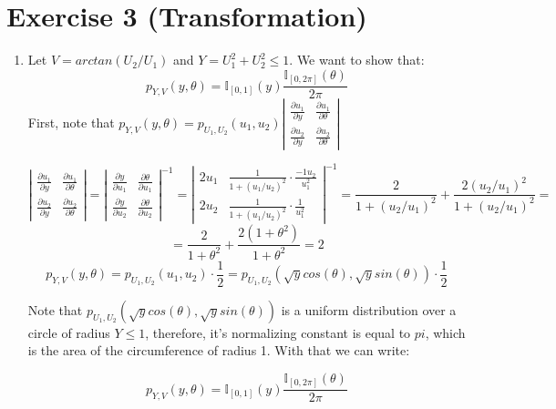 \documentclass[12pt,letterpaper]{article}
\begin{document}
\section*{Exercise 3 (Transformation)}
\begin{enumerate}[leftmargin=!,labelindent=5pt]

	\item Let $V = arctan(U_2/U_1)$ and $Y = U_1^2 + U_2^2 \leq 1$.
	We want to show that:
	$$p_{Y,V}(y,\theta) =
	\mathbb{I}_{[0,1]}(y)\frac{\mathbb{I}_{[0,2\pi]}(\theta)}{2\pi}$$
	First, note that $p_{Y,V}(y,\theta) = p_{U_1,U_2}(u_1,u_2)
	\left|\begin{array}{ccc}
	\frac{\partial u_1}{\partial y} & \frac{\partial u_1}{\partial \theta}
	\\
	\frac{\partial u_2}{\partial y} & \frac{\partial u_2}{\partial \theta}
	\end{array}\right|$

	$$
	\left|\begin{array}{ccc}
	\frac{\partial u_1}{\partial y} & \frac{\partial u_1}{\partial \theta}
	\\
	\frac{\partial u_2}{\partial y} & \frac{\partial u_2}{\partial \theta}
	\end{array}\right| =
	\left|\begin{array}{ccc}
	\frac{\partial y}{\partial u_1} & \frac{\partial \theta}{\partial u_1}
	\\
	\frac{\partial y}{\partial u_2} & \frac{\partial \theta}{\partial u_2}
	\end{array}\right|^{-1} = 
	\left|\begin{array}{ccc}
	2u_1 & \frac{1}{1+(u_1/u_2)^2}\cdot \frac{-1u_2}{u_1^2}
	\\
	2u_2 & \frac{1}{1+(u_1/u_2)^2}\cdot \frac{1}{u_1^2}
	\end{array}\right|^{-1} = 
	\frac{2}{1+(u_2/u_1)^2} + \frac{2(u_2/u_1)^2}{1+(u_2/u_1)^2}=
	$$
	$$ = \frac{2}{1+\theta^2} + \frac{2(1+\theta^2)}{1+\theta^2} = 2$$
	$$
	p_{Y,V}(y,\theta) = p_{U_1,U_2}(u_1,u_2)\cdot\frac{1}{2} =
	p_{U_1,U_2}(\sqrt y cos(\theta), \sqrt y sin(\theta))\cdot\frac{1}{2}
	$$

	Note that $p_{U_1,U_2}(\sqrt y cos(\theta), \sqrt y sin(\theta))$
	is a uniform distribution over a circle of radius $Y \leq 1$, therefore, it's normalizing constant is equal to $pi$, which is the
	area of the circumference of radius 1. With that we can write:

	$$p_{Y,V}(y,\theta) =
	\mathbb{I}_{[0,1]}(y)\frac{\mathbb{I}_{[0,2\pi]}(\theta)}{2\pi}$$


\end{enumerate}
\end{document}
